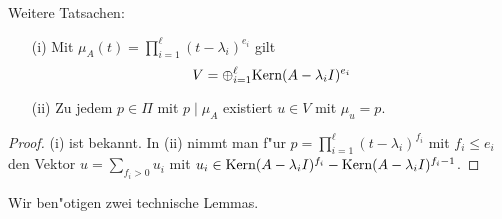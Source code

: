 \begin{lem} \label{normal_tat2:lem}
Weitere Tatsachen:
\begin{itemize}
\item[(i)] Mit $\mu_A(t) = \prod_{i=1}^\ell (t-\lambda_i)^{e_i}$ gilt
\[
V = \oplus_{i=1}^\ell \mbox{Kern}(A-\lambda_i I)^{e_i}
\]
\item[(ii)] Zu jedem $p \in \Pi$ mit $p \mid \mu_A$ existiert $u \in V$ mit $\mu_u = p$.
\end{itemize}
\end{lem}
\begin{proof} (i) ist bekannt. In (ii) nimmt man f"ur $p = \prod_{i=1}^\ell (t-\lambda_i)^{f_i}$ mit $f_i 
\leq e_i$ den Vektor $u = \sum_{f_i > 0} u_i$ mit $u_i \in \mbox{Kern}(A-\lambda_i I)^{f_i} -
 \mbox{Kern}(A-\lambda_i I)^{f_i-1}$.
\end{proof}
\medskip

Wir ben"otigen zwei technische Lemmas. 

